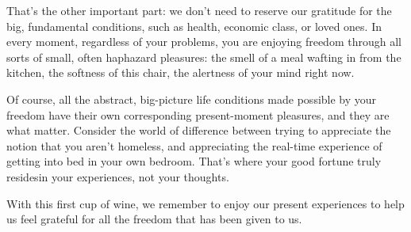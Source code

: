 {  \newReading That's the other important part: we don't need to reserve our
  gratitude for the big, fundamental conditions,
  such as health, economic class, or loved ones. In every moment, regardless of
  your problems, you are enjoying freedom through all sorts of small, often
  haphazard pleasures: the smell of a meal wafting in from the kitchen, the
  softness of this chair, the alertness of your mind right now.

  Of course, all the abstract, big-picture life conditions made possible by your
  freedom have their own corresponding present-moment pleasures, and they are
  what matter. Consider the world of difference between trying to appreciate the
  notion that you aren't homeless, and appreciating the real-time experience of
  getting into bed in your own bedroom. That's where your good fortune truly
  resides\textemdash{}in your experiences, not your thoughts.

  With this first cup of wine, we remember to enjoy our present experiences to
  help us feel grateful for all the freedom that has been given to us.
}


